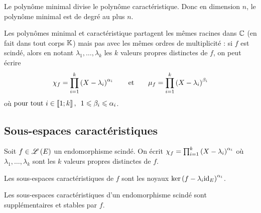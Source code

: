 \begin{cor}
Le polynôme minimal divise le polynôme caractéristique. Donc en dimension \(n\), le polynôme minimal est de degré au plus \(n\).
\end{cor}

Les polynômes minimal et caractéristique partagent les mêmes racines dans \(\mathbb{C}\) (en fait dans tout corps \(\mathbb{K}\)) mais pas avec les mêmes ordres de multiplicité : si \(f\) est scindé, alors en notant \(\lambda_1,\dots,\lambda_k\) les \(k\) valeurs propres distinctes de \(f\), on peut écrire \[\chi_f=\prod_{i=1}^k\left(X-\lambda_i\right)^{\alpha_i}\qquad\text{et}\qquad\mu_f=\prod_{i=1}^k\left(X-\lambda_i\right)^{\beta_i}\] où \(\quantifs{\tpt i\in\interventierii{1}{k}}1\leq\beta_i\leq\alpha_i\).

\subsection{Sous-espaces caractéristiques}

\begin{defi}
Soit \(f\in\mathscr{L}\left(E\right)\) un endomorphisme scindé. On écrit \(\chi_f=\prod_{i=1}^k\left(X-\lambda_i\right)^{\alpha_i}\) où \(\lambda_1,\dots,\lambda_k\) sont les \(k\) valeurs propres distinctes de \(f\).

Les sous-espaces caractéristiques de \(f\) sont les noyaux \(\ker\left(f-\lambda_i\mathrm{id}_{E}\right)^{\alpha_i}\).
\end{defi}

\begin{prop}
Les sous-espaces caractéristiques d'un endomorphisme scindé sont supplémentaires et stables par \(f\).
\end{prop}

